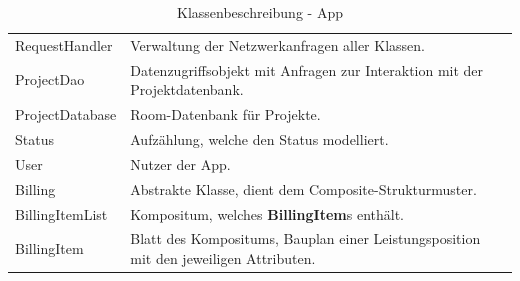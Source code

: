 \begin{table}[h]
\begin{tabularx}{\textwidth}{X X}
		RequestHandler & Verwaltung der Netzwerkanfragen aller Klassen. \\
		
		\rowcolor[HTML]{E7E7E7} 
		ProjectDao & Datenzugriffsobjekt mit Anfragen zur Interaktion mit der Projektdatenbank. \\
		
		ProjectDatabase & Room-Datenbank für Projekte. \\
		
		\rowcolor[HTML]{E7E7E7} 
		Status & Aufzählung, welche den Status modelliert.\\
	
		User & Nutzer der App. \\
		
		\rowcolor[HTML]{E7E7E7}
		Billing & Abstrakte Klasse, dient dem Composite-Strukturmuster. \\
		
		BillingItemList & Kompositum, welches \textbf{BillingItem}s enthält. \\
		
		\rowcolor[HTML]{E7E7E7}
		BillingItem & Blatt des Kompositums, Bauplan einer Leistungsposition mit den jeweiligen Attributen. \\
	\end{tabularx}
	\caption{Klassenbeschreibung - App}
	\label{table:klassenbeschreibung-a}
\end{table}
